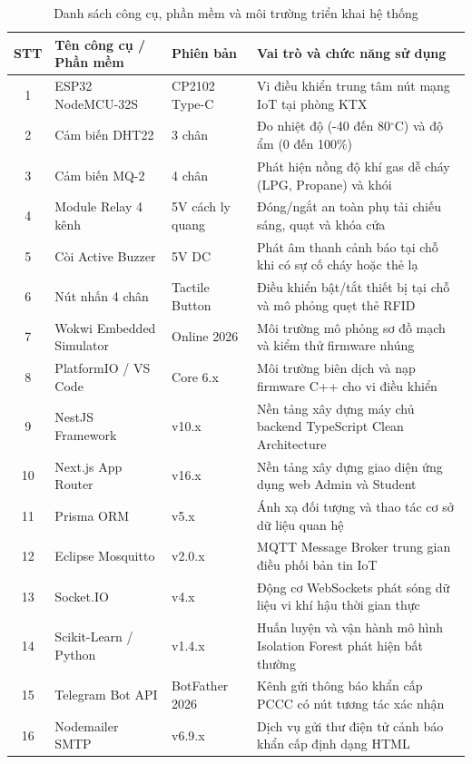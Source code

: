 \begin{table}[H]
\centering
\small
\begin{tabularx}{\textwidth}{|c|p{3.2cm}|p{2.4cm}|X|}
\hline
\textbf{STT} & \textbf{Tên công cụ / Phần mềm} & \textbf{Phiên bản} & \textbf{Vai trò và chức năng sử dụng} \\
\hline
1 & ESP32 NodeMCU-32S & CP2102 Type-C & Vi điều khiển trung tâm nút mạng IoT tại phòng KTX \\
\hline
2 & Cảm biến DHT22 & 3 chân & Đo nhiệt độ (-40 đến 80$^\circ\text{C}$) và độ ẩm (0 đến 100\%) \\
\hline
3 & Cảm biến MQ-2 & 4 chân & Phát hiện nồng độ khí gas dễ cháy (LPG, Propane) và khói \\
\hline
4 & Module Relay 4 kênh & 5V cách ly quang & Đóng/ngắt an toàn phụ tải chiếu sáng, quạt và khóa cửa \\
\hline
5 & Còi Active Buzzer & 5V DC & Phát âm thanh cảnh báo tại chỗ khi có sự cố cháy hoặc thẻ lạ \\
\hline
6 & Nút nhấn 4 chân & Tactile Button & Điều khiển bật/tắt thiết bị tại chỗ và mô phỏng quẹt thẻ RFID \\
\hline
7 & Wokwi Embedded Simulator & Online 2026 & Môi trường mô phỏng sơ đồ mạch và kiểm thử firmware nhúng \\
\hline
8 & PlatformIO / VS Code & Core 6.x & Môi trường biên dịch và nạp firmware C++ cho vi điều khiển \\
\hline
9 & NestJS Framework & v10.x & Nền tảng xây dựng máy chủ backend TypeScript Clean Architecture \\
\hline
10 & Next.js App Router & v16.x & Nền tảng xây dựng giao diện ứng dụng web Admin và Student \\
\hline
11 & Prisma ORM & v5.x & Ánh xạ đối tượng và thao tác cơ sở dữ liệu quan hệ \\
\hline
12 & Eclipse Mosquitto & v2.0.x & MQTT Message Broker trung gian điều phối bản tin IoT \\
\hline
13 & Socket.IO & v4.x & Động cơ WebSockets phát sóng dữ liệu vi khí hậu thời gian thực \\
\hline
14 & Scikit-Learn / Python & v1.4.x & Huấn luyện và vận hành mô hình Isolation Forest phát hiện bất thường \\
\hline
15 & Telegram Bot API & BotFather 2026 & Kênh gửi thông báo khẩn cấp PCCC có nút tương tác xác nhận \\
\hline
16 & Nodemailer SMTP & v6.9.x & Dịch vụ gửi thư điện tử cảnh báo khẩn cấp định dạng HTML \\
\hline
\end{tabularx}
\caption{Danh sách công cụ, phần mềm và môi trường triển khai hệ thống}
\label{tab:cong_cu_trien_khai}
\end{table}

\newpage
